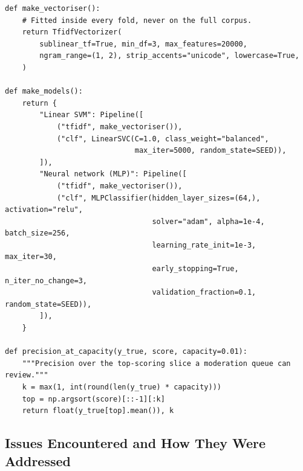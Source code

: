\begin{lstlisting}[caption={Feature pipeline and the two estimators
(\texttt{code/03\_analysis.py}).}, label={lst:models}]
def make_vectoriser():
    # Fitted inside every fold, never on the full corpus.
    return TfidfVectorizer(
        sublinear_tf=True, min_df=3, max_features=20000,
        ngram_range=(1, 2), strip_accents="unicode", lowercase=True,
    )

def make_models():
    return {
        "Linear SVM": Pipeline([
            ("tfidf", make_vectoriser()),
            ("clf", LinearSVC(C=1.0, class_weight="balanced",
                              max_iter=5000, random_state=SEED)),
        ]),
        "Neural network (MLP)": Pipeline([
            ("tfidf", make_vectoriser()),
            ("clf", MLPClassifier(hidden_layer_sizes=(64,), activation="relu",
                                  solver="adam", alpha=1e-4, batch_size=256,
                                  learning_rate_init=1e-3, max_iter=30,
                                  early_stopping=True, n_iter_no_change=3,
                                  validation_fraction=0.1, random_state=SEED)),
        ]),
    }

def precision_at_capacity(y_true, score, capacity=0.01):
    """Precision over the top-scoring slice a moderation queue can review."""
    k = max(1, int(round(len(y_true) * capacity)))
    top = np.argsort(score)[::-1][:k]
    return float(y_true[top].mean()), k
\end{lstlisting}

\subsection{Issues Encountered and How They Were Addressed}

